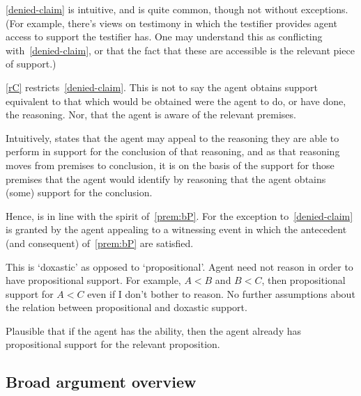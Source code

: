 \documentclass[10pt]{article}
\begin{document}
\begin{note}[\mp{} is intuitive]
  \ref{denied-claim} is intuitive, and is quite common, though not without exceptions.
(For example, there's views on testimony in which the testifier provides agent access to support the testifier has.
One may understand this as conflicting with~\ref{denied-claim}, or that the fact that these are accessible is the relevant piece of support.)
\end{note}

\begin{note}[Alternative]
  \ref{rC} restricts~\ref{denied-claim}.
  This is not to say the agent obtains support equivalent to that which would be obtained were the agent to do, or have done, the reasoning.
  Nor, that the agent is aware of the relevant premises.

  Intuitively, \rC{} states that the agent may appeal to the reasoning they are able to perform in support for the conclusion of that reasoning, and as that reasoning moves from premises to conclusion, it is on the basis of the support for those premises that the agent would identify by reasoning that the agent obtains (some) support for the conclusion.

  Hence, \rC{} is in line with the spirit of~\ref{prem:bP}.
  For the exception to~\ref{denied-claim} is granted by the agent appealing to a witnessing event in which the antecedent (and consequent) of~\ref{prem:bP} are satisfied.
\end{note}

\begin{note}
  This is `doxastic' as opposed to `propositional'.
  Agent need not reason in order to have propositional support.
  For example, \(A < B\) and \(B < C\), then propositional support for \(A < C\) even if I don't bother to reason.
  No further assumptions about the relation between propositional and doxastic support.
\end{note}

\begin{note}
  Plausible that if the agent has the ability, then the agent already has propositional support for the relevant proposition.
\end{note}

\subsection{Broad argument overview}
\label{sec:broad-argum-overv}
\end{document}
